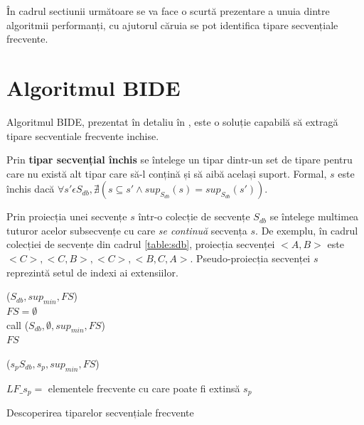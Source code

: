 În cadrul sectiunii următoare se va face o scurtă prezentare a unuia dintre algoritmii performanți, cu ajutorul căruia se pot identifica tipare secvențiale frecvente. 

\section{Algoritmul BIDE}
Algoritmul BIDE, prezentat în detaliu în \cite{bib:wang2004bide}, este o soluție capabilă să extragă tipare secventiale frecvente inchise.

\begin{defi}
Prin \textbf{tipar secvențial închis} se întelege un tipar dintr-un set de tipare pentru care nu există alt tipar care să-l conțină și să aibă același suport. Formal, $s$ este închis dacă $\forall s' \epsilon S_{db}, \nexists (s \subseteq s' \wedge sup_{S_{db}}(s)=sup_{S_{db}}(s'))$.
\end{defi}  

\begin{defi}
Prin proiecția unei secvențe $s$ într-o colecție de secvențe $S_{db}$ se întelege multimea tuturor acelor subsecvențe cu care \textit{se continuă} secvența $s$. De exemplu, în cadrul colecției de secvențe din cadrul \ref{table:sdb}, proiecția secvenței $<A,B>$ este {$<C>,<C, B>,<C>,<B, C, A>$}. Pseudo-proiecția secvenței $s$ reprezintă setul de indexi ai extensiilor. 
\end{defi}  


\begin{algorithm}[H]
\SetAlgoLined
{}
\fse($S_{db}, sup_{min}, FS$) \\
$FS = \emptyset$ \\
call \fs($S_{db}, \emptyset, sup_{min}, FS$) \\
\KwRet $FS$ \\

\BlankLine
\BlankLine

\fs($s_pS_{db}, s_p, sup_{min}, FS$) \\


$LF\_s_p =$ elementele frecvente cu care poate fi extinsă $s_p$

 {
\KwRet
}

\caption{Descoperirea tiparelor secvențiale frecvente}
\label{algo:fse}
\end{algorithm}

